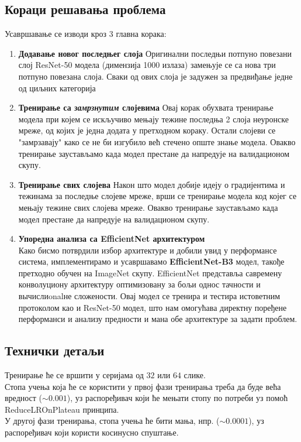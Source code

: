 \documentclass{article}
\begin{document}
 \subsection*{Кораци решавања проблема}
  Усавршавање се изводи кроз 3 главна корака:
  \begin{enumerate}
    \item \textbf{Додавање новог последњег слоја}
      Оригинални последњи потпуно повезани слој ResNet-50 модела (димензија 1000 излаза) замењује се са нова три потпуно повезана слоја. Сваки од ових слоја је задужен за предвиђање једне од циљних категорија
    \item \textbf{Тренирање са \textit{замрзнутим} слојевима}
      Овај корак обухвата тренирање модела при којем се искључиво мењају тежине последња 2 слоја неуронске мреже, од којих је једна додата у претходном кораку. Остали слојеви се "замрзавају" како се не би изгубило већ стечено опште знање модела. Овакво тренирање заустављамо када модел престане да напредује на валидационом скупу.
    \item \textbf{Тренирање свих слојева}
      Након што модел добије идеју о градијентима и тежинама за последње слојеве мреже, врши се тренирање модела код којег се мењају тежине свих слојева мреже. Овакво тренирање заустављамо када модел престане да напредује на валидационом скупу.
    \item \textbf{Упоредна анализа са EfficientNet архитектуром}\\
Како бисмо потврдили избор архитектуре и добили увид у перформансе система, имплементирамо и усавршавамо \textbf{EfficientNet-B3} модел, такође претходно обучен на ImageNet скупу. EfficientNet представља савремену конволуциону архитектуру оптимизовану за бољи однос тачности и вычислиonalне сложености. Овај модел се тренира и тестира истоветним протоколом као и ResNet-50 модел, што нам омогућава директну поређене перформанси и анализу предности и мана обе архитектуре за задати проблем.
  \end{enumerate}
  \subsection*{Технички детаљи}
  Тренирање ће се вршити у серијама од $32$ или $64$ слике. \\ 
  Стопа учења која ће се користити у првој фази тренирања треба да буде већа вредност ($\sim 0.001$), уз распоређивач који ће мењати стопу по потреби уз помоћ ReduceLROnPlateau принципа. \\ 
  У другој фази тренирања, стопа учења ће бити мања, нпр. ($\sim 0.0001$), уз распоређивач који користи косинусно спуштање.
\end{document}
